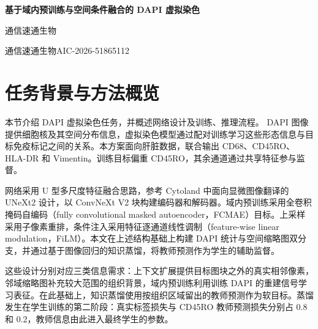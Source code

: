 \documentclass[UTF8,a4paper,zihao=5,fontset=fandol]{ctexart}
\begin{document}
\begin{center}
{\LARGE\bfseries 基于域内预训练与空间条件融合的 DAPI 虚拟染色}\par
\vspace{9pt}
{\large 通信速通生物}\par\vspace{5pt}
通信速通生物\quad AIC-2026-51865112\par
\vspace{9pt}
\end{center}

\begin{abstract}
针对肝脏 DAPI 图像到免疫标记图像的虚拟染色任务，本文构建融合局部上下文与空间条件的四通道预测网络。网络以 ConvNeXt V2 为主干，通过跳跃连接与像素重排恢复分辨率，并以 DAPI 统计特征和邻域缩略图调制瓶颈特征。完整流程包括按组织区域划分数据、DAPI 域内掩码重建预训练、五折教师监督训练与折外目标生成、全量学生监督训练与知识蒸馏，以及固定几何视角推理。学生先学习真实标签，再以真实标签损失和教师预测蒸馏损失的加权和训练；推理仅使用该学生模型，将两个平移视角下的旋转、翻转预测恢复至原坐标并等权平均，输出 CD45RO 图像。五折教师对照中，域内预训练带来 1.03110 的综合分数增益；最终全量学生的平台综合分数为 79.1052，SSIM 为 0.899，PSNR 为 26.932 dB。
\end{abstract}

\FloatBarrier
\section{任务背景与方法概览}\label{sec:overview}
本节介绍 DAPI 虚拟染色任务，并概述网络设计及训练、推理流程。
DAPI 图像提供细胞核及其空间分布信息，虚拟染色模型通过配对训练学习这些形态信息与目标免疫标记之间的关系。本方案面向肝脏数据，联合输出 CD68、CD45RO、HLA-DR 和 Vimentin。训练目标偏重 CD45RO，其余通道通过共享特征参与监督。

网络采用 U 型多尺度特征融合思路\cite{unet}，参考 Cytoland 中面向显微图像翻译的 UNeXt2 设计\cite{cytoland}，以 ConvNeXt V2 块构建编码器和解码器\cite{convnext}。域内预训练采用全卷积掩码自编码（fully convolutional masked autoencoder，FCMAE）目标。上采样采用子像素重排\cite{espcn}，条件注入采用特征逐通道线性调制（feature-wise linear modulation，FiLM）\cite{film}。本文在上述结构基础上构建 DAPI 统计与空间缩略图双分支，并通过基于图像回归的知识蒸馏，将教师预测作为学生的辅助监督。

这些设计分别对应三类信息需求：上下文扩展提供目标图块之外的真实相邻像素，邻域缩略图补充较大范围的组织背景，域内预训练利用训练 DAPI 的重建信号学习表征。在此基础上，知识蒸馏使用按组织区域留出的教师预测作为软目标。蒸馏发生在学生训练的第二阶段：真实标签损失与 CD45RO 教师预测损失分别占 0.8 和 0.2，教师信息由此进入最终学生的参数。
\end{document}
